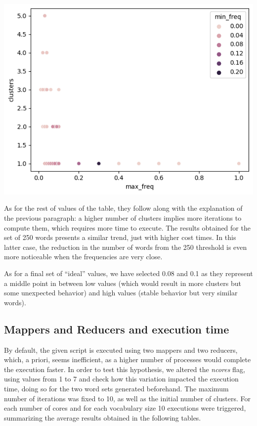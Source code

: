 \includegraphics{figures/clusters_per_freq.png}

As for the rest of values of the table, they follow along with the explanation of the previous paragraph: a higher number of clusters implies more iterations to compute them, which requires more time to execute. The results obtained for the set of 250 words presents a similar trend, just with higher cost times. In this latter case, the reduction in the number of words from the 250 threshold is even more noticeable when the frequencies are very close.

As for a final set of ``ideal'' values, we have selected 0.08 and 0.1 as they represent a middle point in between low values (which would result in more clusters but some unexpected behavior) and high values (stable behavior but very similar words).

\subsection{Mappers and Reducers and execution time}

By default, the given script is executed using two mappers and two reducers,
which, a priori, seems inefficient, as a higher number of processes would
complete the execution faster. In order to test this hypothesis, we altered the
\textit{ncores} flag, using values from 1 to 7 and check how this variation
impacted the execution time, doing so for the two word sets generated
beforehand. The maximum number of iterations was fixed to 10, as well as the
initial number of clusters. For each number of cores and for each vocabulary
size 10 executions were triggered, summarizing the average results obtained in
the following tables.

